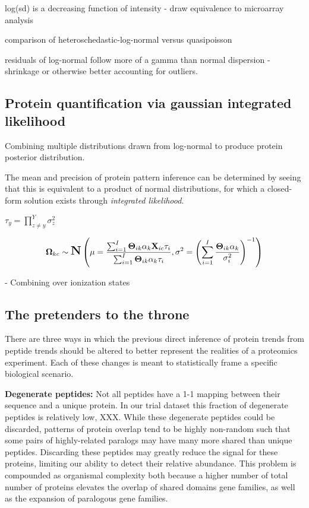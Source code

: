 \documentclass[12pt]{article}
\begin{document}
log(sd) is a decreasing function of intensity - draw equivalence to microarray analysis

comparison of heteroschedastic-log-normal versus quasipoisson

residuals of log-normal follow more of a gamma than normal dispersion - shrinkage or otherwise better
accounting for outliers.

\subsection*{Protein quantification via gaussian integrated likelihood}

Combining multiple distributions drawn from log-normal to produce protein posterior distribution.

The mean and precision of protein pattern inference can be determined by seeing that this is equivalent to a product of normal distributions, for which a closed-form solution exists through \textit{integrated likelihood}.

$\tau_{y} = \prod_{z \neq y}^{Y}\sigma^{2}_{z}$

\begin{align}
\mathbf{\Omega}_{kc} \sim \mbox{\Large \textbf{N}}\left(\mu = \frac{\sum_{i = 1}^{I}\mathbf{\Theta}_{ik}\alpha_{k}\textbf{X}_{ic}\tau_{i}}{\sum_{i = 1}^{I}\mathbf{\Theta}_{ik}\alpha_{k}\tau_{i}}, \sigma^{2} =  \left(\sum_{i = 1}^{I}\frac{\mathbf{\Theta}_{ik}\alpha_{k}}{\sigma^{2}_{i}}\right)^{-1} \right)
\end{align}

- Combining over ionization states

\subsection*{The pretenders to the throne}

There are three ways in which the previous direct inference of protein trends from peptide trends should be altered to better represent the realities of a proteomics experiment. Each of these changes is meant to statistically frame a specific biological scenario.

\textbf{Degenerate peptides:} Not all peptides have a 1-1 mapping between their sequence and a unique protein. In our trial dataset this fraction of degenerate peptides is relatively low, XXX. While these degenerate peptides could be discarded, patterns of protein overlap tend to be highly non-random such that some pairs of highly-related paralogs may have many more shared than unique peptides. Discarding these peptides may greatly reduce the signal for these proteins, limiting our ability to detect their relative abundance. This problem is compounded as organismal complexity both because a higher number of total number of proteins elevates the overlap of shared domains gene families, as well as the expansion of paralogous gene families.
\end{document}
